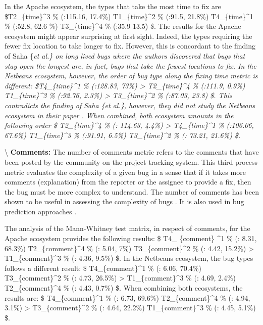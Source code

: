 In the Apache ecosystem, the types that take the most time to fix are
\$T2\_\{time\}\^{}3 \% (\mu:115.16, 17.4\%) \gg T1\_\{time\}\^{}2 \%
(\mu:91.5, 21.8\%) \gg T4\_\{time\}\^{}1 \% (\mu:52.8, 62.6 \%)
\gg T3\_\{time\}\^{}4 \% (\mu:35.9 13.5) \$. The results for the Apache
ecosystem might appear surprising at first sight. Indeed, the types
requiring the fewer fix location to take longer to fix. However, this is
concordant to the finding of Saha \{\it et al.\} on long lived bugs
\cite{Saha2014} where the authors discovered that bugs that stay open
the longest are, in fact, bugs that take the fewest locations to fix. In
the Netbeans ecosystem, however, the order of bug type along the fixing
time metric is different: \$T4\_\{time\}\^{}1 \% (\mu:128.83, 73\%)
\textgreater{} T2\_\{time\}\^{}4 \% (\mu:111.9, 0.9\%)
\gg T1\_\{time\}\^{}3 \% (\mu:92.76, 2.3\%) \textgreater{}
T3\_\{time\}\^{}2 \% (\mu:87.03, 23.8) \$. This contradicts the finding
of Saha \{\it et al.\}, however, they did not study the Netbeans
ecosystem in their paper \cite{Saha2014}. When combined, both ecosystem
amounts in the following order \$ T2\_\{time\}\^{}4 \% (\mu: 114.63,
4.4\%) \textgreater{} T4\_\{time\}\^{}1 \% (\mu:106.06, 67.6\%) \gg
T1\_\{time\}\^{}3 \% (\mu:91.91, 6.5\%) \gg
T3\_\{time\}\^{}2 \% (\mu: 73.21, 21.6\%) \$.

\textbackslash{} \vspace{0.1cm} {\bf Comments: } The number of comments
metric refers to the comments that have been posted by the community on
the project tracking system. This third process metric evaluates the
complexity of a given bug in a sense that if it takes more comments
(explanation) from the reporter or the assignee to provide a fix, then
the bug must be more complex to understand. The number of comments has
been shown to be useful in assessing the complexity of bugs
\cite{Zhang2013,Zhang2012}. It is also used in bug prediction approaches
\cite{DAmbros2010,Bhattacharya2011}.

The analysis of the Mann-Whitney test matrix, in respect of comments,
for the Apache ecosystem provides the following results: \$ T4\_
\{comment\} \^{}1 \% (\mu: 8.31, 68.3\%) \gg
T2\_\{comment\}\^{}4 \% (\mu: 5.04, 7\%) \gg
T3\_\{comment\}\^{}2 \% (\mu: 4.42, 15.2\%) \textgreater{}
T1\_\{comment\}\^{}3 \% (\mu: 4.36, 9.5\%) \$. In the Netbeans
ecosystem, the bug types follows a different result: \$
T4\_\{comment\}\^{}1 \% (\mu: 6.06, 70.4\%) \gg
T3\_\{comment\}\^{}2 \% (\mu: 4.73, 26.5\%) \textgreater{}
T1\_\{comment\}\^{}3 \% (\mu: 4.69, 2.4\%) \gg
T2\_\{comment\}\^{}4 \% (\mu: 4.43, 0.7\%) \$. When combining both
ecosystems, the results are: \$ T4\_\{comment\}\^{}1 \% (\mu: 6.73,
69.6\%) \gg
T2\_\{comment\}\^{}4 \% (\mu: 4.94, 3.1\%) \textgreater{}
T3\_\{comment\}\^{}2 \% (\mu: 4.64, 22.2\%) \gg
T1\_\{comment\}\^{}3 \% (\mu: 4.45, 5.1\%) \$.

